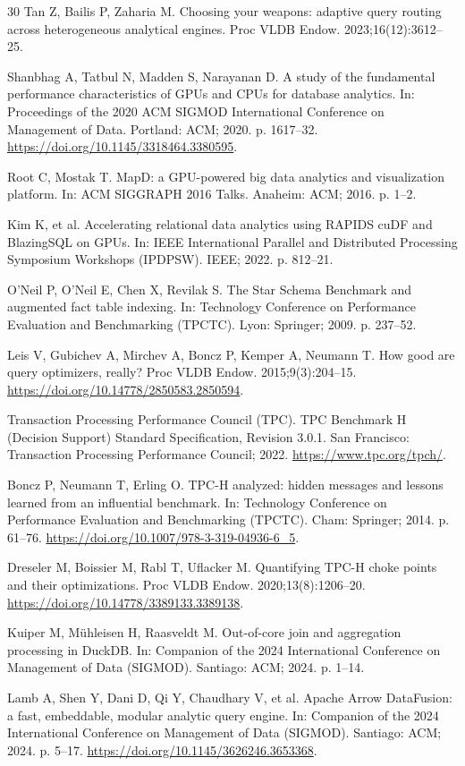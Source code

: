 \documentclass[10pt,a4paper]{article}
\begin{document}
\begin{thebibliography}{30}
Tan Z, Bailis P, Zaharia M. Choosing your weapons: adaptive query routing across heterogeneous analytical engines. Proc VLDB Endow. 2023;16(12):3612--25.

Shanbhag A, Tatbul N, Madden S, Narayanan D. A study of the fundamental performance characteristics of GPUs and CPUs for database analytics. In: Proceedings of the 2020 ACM SIGMOD International Conference on Management of Data. Portland: ACM; 2020. p. 1617--32. \url{https://doi.org/10.1145/3318464.3380595}.

Root C, Mostak T. MapD: a GPU-powered big data analytics and visualization platform. In: ACM SIGGRAPH 2016 Talks. Anaheim: ACM; 2016. p. 1--2.

Kim K, et al. Accelerating relational data analytics using RAPIDS cuDF and BlazingSQL on GPUs. In: IEEE International Parallel and Distributed Processing Symposium Workshops (IPDPSW). IEEE; 2022. p. 812--21.

O'Neil P, O'Neil E, Chen X, Revilak S. The Star Schema Benchmark and augmented fact table indexing. In: Technology Conference on Performance Evaluation and Benchmarking (TPCTC). Lyon: Springer; 2009. p. 237--52.

Leis V, Gubichev A, Mirchev A, Boncz P, Kemper A, Neumann T. How good are query optimizers, really? Proc VLDB Endow. 2015;9(3):204--15. \url{https://doi.org/10.14778/2850583.2850594}.

Transaction Processing Performance Council (TPC). TPC Benchmark H (Decision Support) Standard Specification, Revision 3.0.1. San Francisco: Transaction Processing Performance Council; 2022. \url{https://www.tpc.org/tpch/}.

Boncz P, Neumann T, Erling O. TPC-H analyzed: hidden messages and lessons learned from an influential benchmark. In: Technology Conference on Performance Evaluation and Benchmarking (TPCTC). Cham: Springer; 2014. p. 61--76. \url{https://doi.org/10.1007/978-3-319-04936-6_5}.

Dreseler M, Boissier M, Rabl T, Uflacker M. Quantifying TPC-H choke points and their optimizations. Proc VLDB Endow. 2020;13(8):1206--20. \url{https://doi.org/10.14778/3389133.3389138}.

Kuiper M, M{\"u}hleisen H, Raasveldt M. Out-of-core join and aggregation processing in DuckDB. In: Companion of the 2024 International Conference on Management of Data (SIGMOD). Santiago: ACM; 2024. p. 1--14.

Lamb A, Shen Y, Dani D, Qi Y, Chaudhary V, et al. Apache Arrow DataFusion: a fast, embeddable, modular analytic query engine. In: Companion of the 2024 International Conference on Management of Data (SIGMOD). Santiago: ACM; 2024. p. 5--17. \url{https://doi.org/10.1145/3626246.3653368}.

\end{thebibliography}
\end{document}
